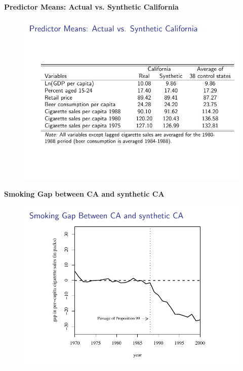 \documentclass[notes=show]{beamer}
\begin{document}
\begin{frame}[plain]
	\begin{center}
	\textbf{Predictor Means: Actual vs. Synthetic California}
	\end{center}
	
	\begin{figure}
	\includegraphics[scale=0.75]{./lecture_includes/abadie_5.pdf}
	\end{figure}
\end{frame}

\begin{frame}[plain]
	\begin{center}
	\textbf{Smoking Gap between CA and synthetic CA}
	\end{center}
	
	\begin{figure}
	\includegraphics[scale=0.75]{./lecture_includes/abadie_6.pdf}
	\end{figure}
\end{frame}
\end{document}
